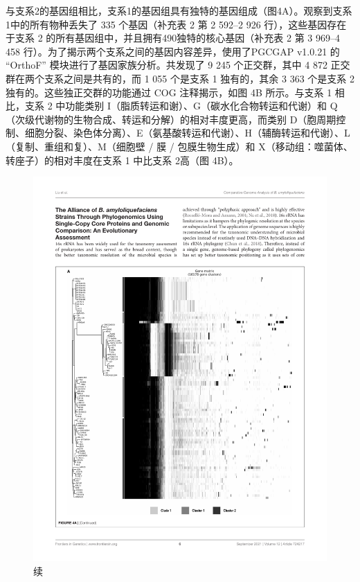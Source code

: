 \documentclass[UTF8]{ctexart}
\begin{document}
与支系2的基因组相比，支系1的基因组具有独特的基因组成（图4A）。观察到支系1中的所有物种丢失了 335 个基因（补充表 2 第 2 592--2 926 行），这些基因存在于支系 2 的所有基因组中，并且拥有490独特的核心基因（补充表 2 第 3 969--4 458 行）。为了揭示两个支系之间的基因内容差异，使用了PGCGAP v1.0.21 的 ``OrthoF'' 模块进行了基因家族分析。共发现了 9 245 个正交群，其中 4 872 正交群在两个支系之间是共有的，而 1 055 个是支系 1 独有的，其余 3 363 个是支系 2 独有的。这些独正交群的功能通过 COG 注释揭示，如图 4B 所示。与支系 1 相比，支系 2 中功能类别 I（脂质转运和谢）、G（碳水化合物转运和代谢）和 Q（次级代谢物的生物合成、转运和分解）的相对丰度更高，而类别 D（胞周期控制、细胞分裂、染色体分离）、E（氨基酸转运和代谢）、H（辅酶转运和代谢）、L（复制、重组和复）、M（细胞壁 / 膜 / 包膜生物生成）和 X（移动组：噬菌体、转座子）的相对丰度在支系 1 中比支系 2高（图 4B）。
\begin{figure}[!htb]
    \centering
    \includegraphics[width=\textwidth]{figures/figure4A.pdf}
    \caption{续}
\end{figure}
\end{document}
